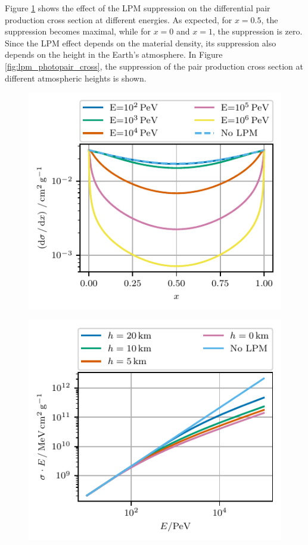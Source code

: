 Figure \ref{fig:lpm_photopair_diff} shows the effect of the LPM suppression on the differential pair production cross section at different energies.
As expected, for $x = 0.5$, the suppression becomes maximal, while for $x=0$ and $x=1$, the suppression is zero.
Since the LPM effect depends on the material density, its suppression also depends on the height in the Earth's atmosphere.
In Figure \ref{fig:lpm_photopair_cross}, the suppression of the pair production cross section at different atmospheric heights is shown.
%
\begin{figure}
\centering
\begin{minipage}[t]{.48\textwidth}
  \centering
  \includegraphics{plots/lpm_photopair_differential_small.pdf}
  \label{fig:lpm_photopair_diff}
\end{minipage}%
\hfill
\begin{minipage}[t]{.48\textwidth}
  \centering
  \includegraphics{plots/lpm_cross_photopair_small.pdf}

\end{minipage}
\end{figure}

